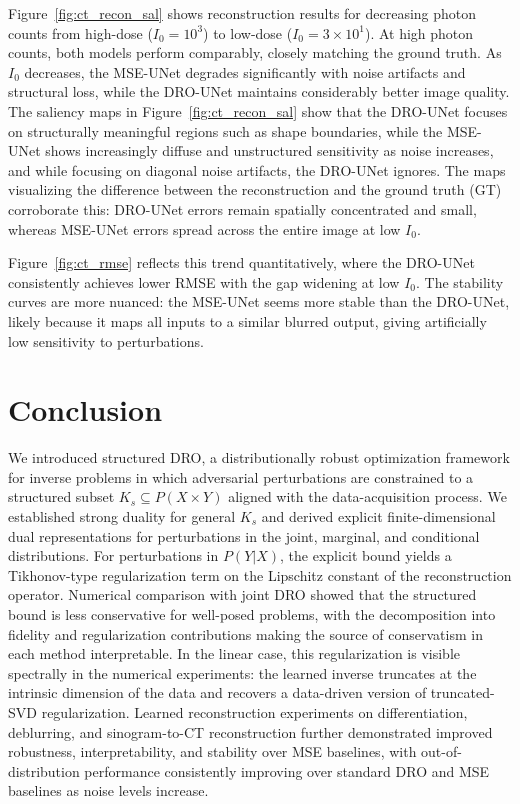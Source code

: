 \documentclass{article}
\theoremstyle{definition}
\theoremstyle{remarksty}
\begin{document}
Figure~\ref{fig:ct_recon_sal} shows reconstruction results for decreasing photon counts from high-dose ($I_0=10^3$) to low-dose ($I_0=3\times10^1$). At high photon counts, both models perform comparably, closely matching the ground truth. As $I_0$ decreases, the MSE-UNet degrades significantly with noise artifacts and structural loss, while the DRO-UNet maintains considerably better image quality. The saliency maps in Figure~\ref{fig:ct_recon_sal} show that the DRO-UNet focuses on structurally meaningful regions such as shape boundaries, while the MSE-UNet shows increasingly diffuse and unstructured sensitivity as noise increases, and while focusing on diagonal noise artifacts, the DRO-UNet ignores. The maps visualizing the difference between the reconstruction and the ground truth (GT) corroborate this: DRO-UNet errors remain spatially concentrated and small, whereas MSE-UNet errors spread across the entire image at low $I_0$.

Figure~\ref{fig:ct_rmse} reflects this trend quantitatively, where the DRO-UNet consistently achieves lower RMSE with the gap widening at low $I_0$. The stability curves are more nuanced:  the MSE-UNet seems more stable than the DRO-UNet, likely because it maps all inputs to a similar blurred output, giving artificially low sensitivity to perturbations.


\FloatBarrier
\section{Conclusion}
We introduced structured DRO, a distributionally robust optimization framework for inverse problems in which adversarial perturbations are constrained to a structured subset $K_s \subseteq P(X \times Y)$ aligned with the data-acquisition process. We established strong duality for general $K_s$ and derived explicit finite-dimensional dual representations for perturbations in the joint, marginal, and conditional distributions. For perturbations in $P(Y|X)$, the explicit bound yields a Tikhonov-type regularization term on the Lipschitz constant of the reconstruction operator. Numerical comparison with joint DRO showed that the structured bound is less conservative for well-posed problems, with the decomposition into fidelity and regularization contributions making the source of conservatism in each method interpretable. In the linear case, this regularization is visible spectrally in the numerical experiments: the learned inverse truncates at the intrinsic dimension of the data and recovers a data-driven version of truncated-SVD regularization. Learned reconstruction experiments on differentiation, deblurring, and sinogram-to-CT reconstruction further demonstrated improved robustness, interpretability, and stability over MSE baselines, with out-of-distribution performance consistently improving over standard DRO and MSE baselines as noise levels increase. 
\end{document}
